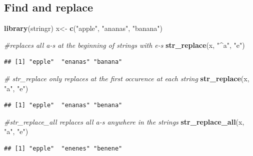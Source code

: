 \documentclass[]{book}
\newenvironment{Shaded}{\begin{snugshade}}{\end{snugshade}}
\newcommand{\KeywordTok}[1]{\textcolor[rgb]{0.13,0.29,0.53}{\textbf{#1}}}
\newcommand{\StringTok}[1]{\textcolor[rgb]{0.31,0.60,0.02}{#1}}
\newcommand{\CommentTok}[1]{\textcolor[rgb]{0.56,0.35,0.01}{\textit{#1}}}
\newcommand{\NormalTok}[1]{#1}
\begin{document}
\subsection{Find and replace}\label{find-and-replace}

\begin{Shaded}
\begin{Highlighting}[]
\KeywordTok{library}\NormalTok{(stringr)}
\NormalTok{x<-}\StringTok{ }\KeywordTok{c}\NormalTok{(}\StringTok{"apple"}\NormalTok{, }\StringTok{"ananas"}\NormalTok{, }\StringTok{"banana"}\NormalTok{)}

\CommentTok{#replaces all a-s at the beginning of strings with e-s}
\KeywordTok{str_replace}\NormalTok{(x, }\StringTok{"^a"}\NormalTok{, }\StringTok{"e"}\NormalTok{) }
\end{Highlighting}
\end{Shaded}

\begin{verbatim}
## [1] "epple"  "enanas" "banana"
\end{verbatim}

\begin{Shaded}
\begin{Highlighting}[]
\CommentTok{# str_replace only replaces at the first occurence at each string}
\KeywordTok{str_replace}\NormalTok{(x, }\StringTok{"a"}\NormalTok{, }\StringTok{"e"}\NormalTok{) }
\end{Highlighting}
\end{Shaded}

\begin{verbatim}
## [1] "epple"  "enanas" "benana"
\end{verbatim}

\begin{Shaded}
\begin{Highlighting}[]
\CommentTok{#str_replace_all replaces all a-s anywhere in the strings}
\KeywordTok{str_replace_all}\NormalTok{(x, }\StringTok{"a"}\NormalTok{, }\StringTok{"e"}\NormalTok{) }
\end{Highlighting}
\end{Shaded}

\begin{verbatim}
## [1] "epple"  "enenes" "benene"
\end{verbatim}

\begin{Shaded}
\end{Shaded}
\end{document}
